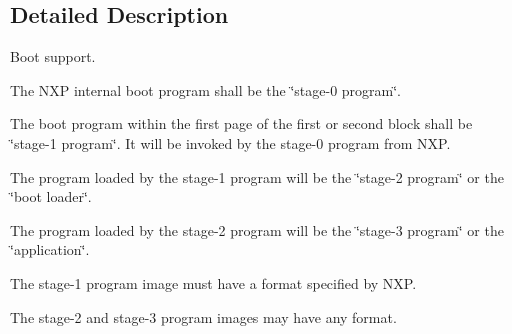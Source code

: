 \subsection{Detailed Description}
Boot support. 

The N\+XP internal boot program shall be the \char`\"{}stage-\/0 program\char`\"{}.

The boot program within the first page of the first or second block shall be \char`\"{}stage-\/1 program\char`\"{}. It will be invoked by the stage-\/0 program from N\+XP.

The program loaded by the stage-\/1 program will be the \char`\"{}stage-\/2 program\char`\"{} or the \char`\"{}boot loader\char`\"{}.

The program loaded by the stage-\/2 program will be the \char`\"{}stage-\/3 program\char`\"{} or the \char`\"{}application\char`\"{}.

The stage-\/1 program image must have a format specified by N\+XP.

The stage-\/2 and stage-\/3 program images may have any format. 